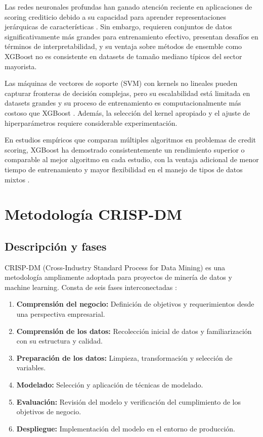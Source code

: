 Las redes neuronales profundas han ganado atención reciente en aplicaciones de scoring crediticio debido a su capacidad para aprender representaciones jerárquicas de características \citep{xia2017novel}. Sin embargo, requieren conjuntos de datos significativamente más grandes para entrenamiento efectivo, presentan desafíos en términos de interpretabilidad, y su ventaja sobre métodos de ensemble como XGBoost no es consistente en datasets de tamaño mediano típicos del sector mayorista.

Las máquinas de vectores de soporte (SVM) con kernels no lineales pueden capturar fronteras de decisión complejas, pero su escalabilidad está limitada en datasets grandes y su proceso de entrenamiento es computacionalmente más costoso que XGBoost \citep{huang2007credit}. Además, la selección del kernel apropiado y el ajuste de hiperparámetros requiere considerable experimentación.

En estudios empíricos que comparan múltiples algoritmos en problemas de credit scoring, XGBoost ha demostrado consistentemente un rendimiento superior o comparable al mejor algoritmo en cada estudio, con la ventaja adicional de menor tiempo de entrenamiento y mayor flexibilidad en el manejo de tipos de datos mixtos \citep{lessmann2015benchmarking, xia2017novel}.

\section{Metodología CRISP-DM}
\subsection{Descripción y fases}
CRISP-DM (Cross-Industry Standard Process for Data Mining) es una metodología ampliamente adoptada para proyectos de minería de datos y machine learning. Consta de seis fases interconectadas \citep{wirth2000crisp, chapman2000crisp}:

\begin{enumerate}
    \item \textbf{Comprensión del negocio:} Definición de objetivos y requerimientos desde una perspectiva empresarial.
    \item \textbf{Comprensión de los datos:} Recolección inicial de datos y familiarización con su estructura y calidad.
    \item \textbf{Preparación de los datos:} Limpieza, transformación y selección de variables.
    \item \textbf{Modelado:} Selección y aplicación de técnicas de modelado.
    \item \textbf{Evaluación:} Revisión del modelo y verificación del cumplimiento de los objetivos de negocio.
    \item \textbf{Despliegue:} Implementación del modelo en el entorno de producción.
\end{enumerate}

